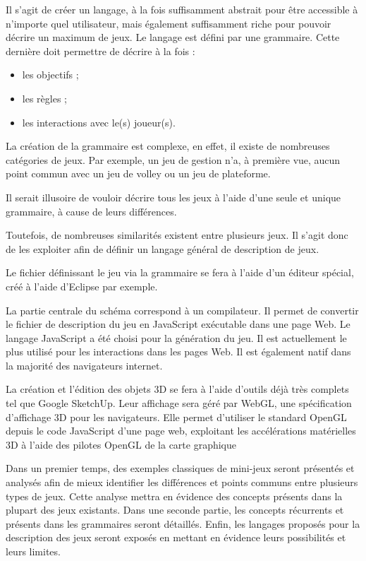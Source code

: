 Il s'agit de créer un langage, à la fois suffisamment abstrait pour être accessible à n'importe quel utilisateur, mais également suffisamment riche
pour pouvoir décrire un maximum de jeux.
Le langage est défini par une grammaire.
Cette dernière doit permettre de décrire à la fois :
\begin{itemize}
 \item les objectifs ;
 \item les règles ;
 \item les interactions avec le(s) joueur(s).
\end{itemize}

La création de la grammaire est complexe, en effet, il existe de nombreuses catégories de jeux.
Par exemple, un jeu de gestion n'a, à première vue, aucun point commun avec un jeu de volley ou un jeu de plateforme.

Il serait illusoire de vouloir décrire tous les jeux à l'aide d'une seule et unique grammaire, à cause de leurs différences.

Toutefois, de nombreuses similarités existent entre plusieurs jeux. Il s'agit donc de les exploiter afin de définir un langage général de description de jeux.

Le fichier définissant le jeu via la grammaire se fera à l'aide d'un éditeur spécial, créé à l'aide d'Eclipse par exemple.

\vspace{0.5cm}

La partie centrale du schéma correspond à un compilateur.
Il permet de convertir le fichier de description du jeu en JavaScript exécutable dans une page Web.
Le langage JavaScript a été choisi pour la génération du jeu. Il est actuellement le plus utilisé pour les interactions dans les pages Web.
Il est également natif dans la majorité des navigateurs internet.

La création et l'édition des objets 3D se fera à l'aide d'outils déjà très complets tel que Google SketchUp.
Leur affichage sera géré par WebGL, une spécification d'affichage 3D pour les navigateurs. 
Elle permet d'utiliser le standard OpenGL depuis le code JavaScript d'une page web, 
exploitant les accélérations matérielles 3D à l'aide des pilotes OpenGL de la carte graphique

\vspace{0.5cm}

Dans un premier temps, des exemples classiques de mini-jeux seront présentés et analysés afin de mieux identifier
les différences et points communs entre plusieurs types de jeux. Cette analyse mettra en évidence des concepts 
présents dans la plupart des jeux existants.
Dans une seconde partie, les concepts récurrents et présents dans les grammaires seront détaillés.
Enfin, les langages proposés pour la description des jeux seront exposés en mettant en évidence leurs possibilités et leurs limites.